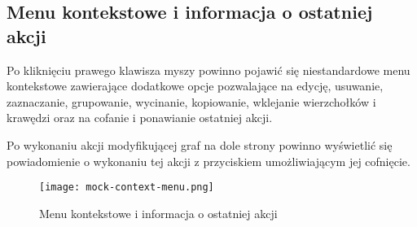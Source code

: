 \pagebreak

\subsection*{Menu kontekstowe i informacja o ostatniej akcji}

Po kliknięciu prawego klawisza myszy powinno pojawić się niestandardowe menu kontekstowe zawierające dodatkowe opcje pozwalające na edycję, usuwanie, zaznaczanie, grupowanie, wycinanie, kopiowanie, wklejanie wierzchołków i krawędzi oraz na cofanie i ponawianie ostatniej akcji.

Po wykonaniu akcji modyfikującej graf na dole strony powinno wyświetlić się powiadomienie o wykonaniu tej akcji z przyciskiem umożliwiającym jej cofnięcie. 

\vspace*{\fill}
\begin{figure}[H]
\centering
\texttt{[image: mock-context-menu.png]}
\caption{Menu kontekstowe i informacja o ostatniej akcji}
\end{figure}
\vspace*{\fill}